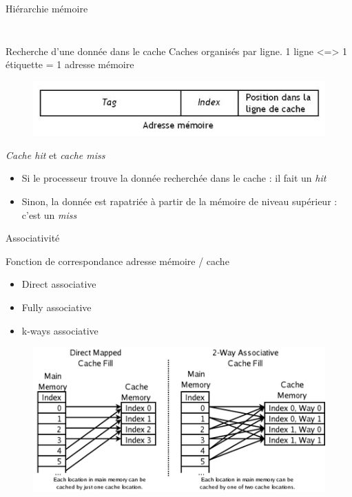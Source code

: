 \begin{frame}{Hiérarchie mémoire}
\begin{columns}[c]
\begin{column}{.4\textwidth}
\begin{figure}[h!]
			\end{figure}
		\end{column}
	\end{columns}
\end{frame}


\begin{frame}{Recherche d'une donnée dans le cache}
	Caches organisés par ligne. 1 ligne <=> 1 étiquette = 1 adresse mémoire
	\begin{figure}[h!]
		\includegraphics[scale=.3]{images/etiquette.jpeg}
	\end{figure}
	
	\begin{block}{\emph{Cache hit} et \emph{cache miss}}
		\begin{itemize}
			\item{Si le processeur trouve la donnée recherchée dans le cache : il fait un \emph{hit}}
			\item{Sinon, la donnée est rapatriée à partir de la mémoire de niveau supérieur : c'est un \emph{miss}}			
			\end{itemize}
	\end{block}
\end{frame}	

\begin{frame}{Associativité}
	\begin{block}{Fonction de correspondance adresse mémoire / cache}
		\begin{itemize}
			\item{Direct associative}
			\item{Fully associative}
			\item{k-ways associative}
		\end{itemize}
	\end{block}
	\begin{figure}[h!]
		\includegraphics[scale=.33]{images/associative.png}
	\end{figure}
\end{frame}

